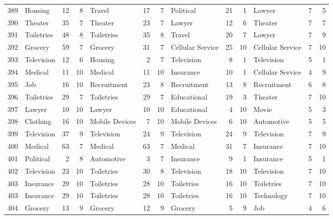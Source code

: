 \begin{figure}[htbp]
\begin{tabular}{rlrrlrrlrrlrr}
    389   & Housing & 12    & 8     & Travel & 17    & 7     & Political & 21    & 1     & Lawyer & 7     & 5 \\
    390   & Theater & 35    & 7     & Theater & 23    & 7     & Lawyer & 12    & 6     & Theater & 7     & 7 \\
    391   & Toiletries & 48    & 8     & Toiletries & 35    & 8     & Travel & 20    & 7     & Lawyer & 7     & 9 \\
    392   & Grocery & 59    & 7     & Grocery & 31    & 7     & Cellular Service & 25    & 10    & Cellular Service & 7     & 10 \\
    393   & Television & 12    & 6     & Housing & 2     & 7     & Television & 8     & 1     & Television & 5     & 1 \\
    394   & Medical & 11    & 10    & Medical & 11    & 10    & Insurance & 10    & 1     & Cellular Service & 4     & 9 \\
    395   & Job   & 16    & 10    & Recruitment & 23    & 8     & Recruitment & 13    & 8     & Recruitment & 6     & 8 \\
    396   & Toiletries & 29    & 7     & Toiletries & 29    & 7     & Educational & 19    & 3     & Theater & 7     & 10 \\
    397   & Lawyer & 10    & 10    & Lawyer & 10    & 10    & Educational & 4     & 10    & Movie & 5     & 3 \\
    398   & Clothing & 16    & 10    & Mobile Devices & 7     & 10    & Mobile Devices & 6     & 10    & Automotive & 5     & 5 \\
    399   & Television & 37    & 9     & Television & 24    & 9     & Television & 24    & 9     & Television & 7     & 9 \\
    400   & Medical & 63    & 7     & Medical & 63    & 7     & Medical & 31    & 7     & Insurance & 7     & 10 \\
    401   & Political & 2     & 8     & Automotive & 3     & 7     & Insurance & 9     & 1     & Insurance & 5     & 1 \\
    402   & Television & 23    & 10    & Toiletries & 30    & 8     & Television & 18    & 10    & Television & 7     & 10 \\
    403   & Insurance & 29    & 10    & Toiletries & 28    & 10    & Toiletries & 16    & 10    & Toiletries & 7     & 10 \\
    403   & Insurance & 29    & 10    & Toiletries & 28    & 10    & Toiletries & 16    & 10    & Technology & 7     & 10 \\
    404   & Grocery & 13    & 9     & Grocery & 12    & 9     & Grocery & 5     & 9     & Job   & 4     & 6 \\

\end{tabular}
\end{figure}
